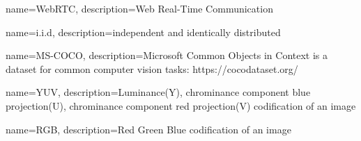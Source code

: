 {
    name=WebRTC,
    description={Web Real-Time Communication}
}

{
    name=i.i.d,
    description={independent and identically distributed}
}

{
    name=MS-COCO,
    description={Microsoft Common Objects in Context is a dataset for common computer vision tasks: https://cocodataset.org/}
}

{
    name=YUV,
    description={Luminance(Y), chrominance component blue projection(U), chrominance component red projection(V) codification of an image}
}

{
    name=RGB,
    description={Red Green Blue codification of an image}
}



